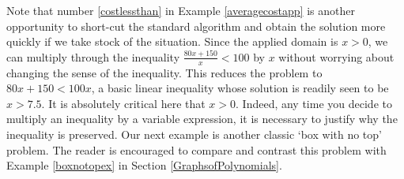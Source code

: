 \documentclass{ximera}
\begin{document}
Note that number \ref{costlessthan} in Example \ref{averagecostapp} is another opportunity to short-cut the standard algorithm and obtain the solution more quickly if we take stock of the situation.  Since the applied domain is $x>0$, we can multiply through the inequality $\frac{80x+150}{x}  <  100$ by $x$ without worrying about changing the sense of the inequality.  This reduces the problem to  $80x+150 < 100x$, a basic linear inequality whose solution is readily seen to be $x > 7.5$.   It is absolutely critical here that $x>0$. Indeed, any time you decide to multiply an inequality by a variable expression, it is necessary to justify why the inequality is preserved.  Our next example is another classic `box with no top' problem.  The reader is encouraged to compare and contrast this problem with  Example \ref{boxnotopex} in Section \ref{GraphsofPolynomials}.
\end{document}
